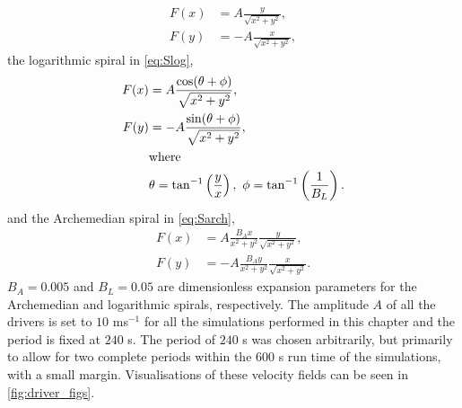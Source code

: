 \documentclass[a4paper,12pt,fourier,authoryear,custommargin]{Classes/PhDThesisPSnPDF}
\begin{document}
\begin{subequations}
	\begin{align}
		F(x) &= A \frac{y}{\sqrt{x^2 + y^2}},\\
		F(y) &= - A \frac{x}{\sqrt{x^2 + y^2}},
	\end{align}
	\label{eq:Suni}
\end{subequations}
the logarithmic spiral in \cref{eq:Slog},
\begin{subequations}
	\begin{align}
		F(x) &= A \frac{\cos(\theta + \phi)}{\sqrt{x^2 + y^2}},\\
		F(y) &= - A \frac{\sin(\theta + \phi)}{\sqrt{x^2 + y^2}},\\
			&\text{where}\notag\\
			&\theta = \tan^{-1}\left(\frac{y}{x}\right),\ \phi = \tan^{-1}\left(\frac{1}{B_L}\right).\notag	
	\end{align}
	\label{eq:Slog}
\end{subequations}
and the Archemedian spiral in \cref{eq:Sarch},
\begin{subequations}
	\begin{align}
		F(x) &= A \frac{B_Ax}{x^2 + y^2} \frac{y}{\sqrt{x^2 + y^2}},\\
		F(y) &= - A \frac{B_Ay}{x^2 + y^2} \frac{x}{\sqrt{x^2 + y^2}}.
	\end{align}
	\label{eq:Sarch}
\end{subequations}
$B_A = 0.005$ and $B_L = 0.05$ are dimensionless expansion parameters for the Archemedian  and logarithmic spirals, respectively.
The amplitude $A$ of all the drivers is set to $10$ ms$^{-1}$ for all the simulations performed in this chapter and the period is fixed at $240$ s.
The period of $240$ s was chosen arbitrarily, but primarily to allow for two complete periods within the $600$ s run time of the simulations, with a small margin.
Visualisations of these velocity fields can be seen in \cref{fig:driver_figs}.
\end{document}

